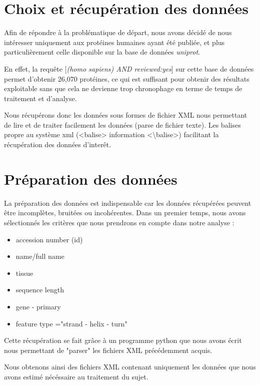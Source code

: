 \section*{Choix et récupération des données}

Afin de répondre à la problématique de départ, nous avons décidé de nous intéresser uniquement aux protéines humaines ayant été publiée, et plus particulièrement celle disponible sur la base de données \emph{uniprot}.

En effet, la requête [\emph{(homo sapiens) AND reviewed:yes}] sur cette base de données permet d'obtenir 26,070 protéines, ce qui est suffisant pour obtenir des résultats exploitable sans que cela ne devienne trop chronophage en terme de temps de traitement et d'analyse.

Nous récupérons donc les données sous formes de fichier XML nous permettant de lire et de traiter facilement les données (parse de fichier texte). Les balises propre au système xml (<balise> information <\textbackslash balise>) facilitant la récupération des données d'inter\^et.

\section*{Préparation des données}
La préparation des données est indispensable car les données récupérées peuvent être incomplètes, bruitées ou incohérentes. 
Dans un premier temps, nous avons sélectionnés les critères que nous prendrons en compte dans notre analyse :
\renewcommand\labelitemi{\textbullet}
\begin{itemize}
\item accession number (id)
\item name/full name
\item tissue
\item sequence length
\item gene - primary
\item feature type ="strand  - helix - turn"
\end{itemize}

Cette récupération se fait grâce à un programme python que nous avons écrit nous permettant de "parser" les fichiers XML précédemment acquis.

Nous obtenons ainsi des fichiers XML contenant uniquement les données que nous avons estimé nécéssaire au traitement du sujet.


